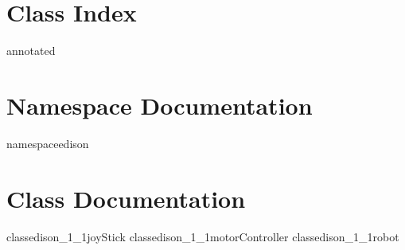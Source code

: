 

	\chapter{Class Index}
		{annotated}
	\chapter{Namespace Documentation}
		{namespaceedison}
		
	\chapter{Class Documentation}
		{classedison_1_1joyStick}
		{classedison_1_1motorController}
		{classedison_1_1robot}